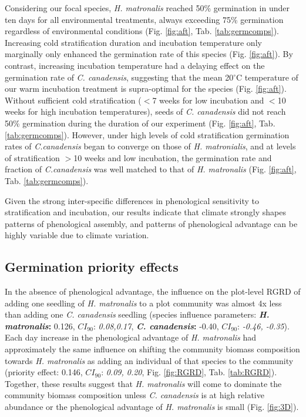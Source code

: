 \documentclass{article}[11pt]
\begin{document}
Considering our focal species, \textit{H. matronalis} reached 50\% germination in under ten days for all environmental treatments, always exceeding 75\% germination regardless of environmental conditions (Fig. \ref{fig:aft}, Tab. \ref{tab:germcomps}). Increasing cold stratification duration and incubation temperature only marginally only enhanced the germination rate of this species (Fig. \ref{fig:aft}). By contrast, increasing incubation temperature had a delaying effect on the germination rate of \textit{C. canadensis}, suggesting that the mean 20$^{\circ}$C temperature of our warm incubation treatment is supra-optimal for the species (Fig. \ref{fig:aft}). Without sufficient cold stratification ($<$7 weeks for low incubation and $<$10 weeks for high incubation temperatures), seeds of  \textit{C. canadensis} did not reach 50\% germination during the duration of our experiment (Fig. \ref{fig:aft}, Tab. \ref{tab:germcomps}). However, under high levels of cold stratification germination rates of \textit{C.canadensis} began to converge on those of \textit{H. matronialis}, and at levels of stratification $>$10 weeks and low incubation, the germination rate and fraction of \textit{C.canadensis} was well matched to that of \textit{H. matronalis} (Fig. \ref{fig:aft}, Tab. \ref{tab:germcomps}).

Given the strong inter-specific differences in phenological sensitivity to stratification and incubation, our results indicate that climate strongly shapes patterns of phenological assembly, and patterns of phenological advantage can be highly variable due to climate variation.

\subsection*{Germination priority effects}
In the absence of phenological advantage, the influence on the plot-level RGRD of adding one seedling of \textit{H. matronalis} to a plot community was almost 4x less than adding one \textit{C. canadensis} seedling (species influence parameters:  \textbf{\textit{H. matronalis}:} 0.126, $CI_{90}$: \textit{0.08,0.17}, \textbf{\textit{C. canadensis}:} -0.40, $CI_{90}$: \textit{-0.46, -0.35}). Each day increase in the phenological advantage of \textit{ H. matronalis} had approximately the same influence on shifting the community biomass composition towards \textit{H. matronalis} as adding an individual of that species to the community (priority effect: 0.146, $CI_{90}$: \textit{0.09, 0.20}, Fig. \ref{fig:RGRD}, Tab. \ref{tab:RGRD}). Together, these results suggest that \textit{H. matronalis} will come to dominate the community biomass composition unless \textit{C. canadensis} is at high relative abundance or the phenological advantage of \textit{H. matronalis} is small (Fig. \ref{fig:3D}).
\end{document}
